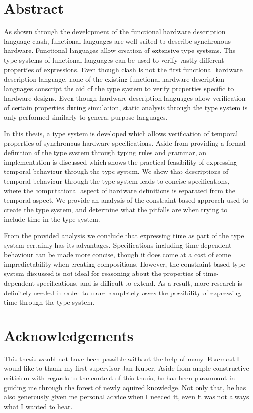 \documentclass[a4paper, 11pt,oldfontcommands]{memoir}
\begin{document}
\chapter{Abstract}
As shown through the development of the functional hardware description language \gls{clash}, functional languages are well suited to describe synchronous hardware.
Functional languages allow creation of extensive type systems.
The type systems of functional languages can be used to verify vastly different properties of expressions.
Even though \gls{clash} is not the first functional hardware description language, none of the existing functional hardware description languages conscript the aid of the type system to verify properties specific to hardware designs.
Even though hardware description languages allow verification of certain properties during simulation, static analysis through the type system is only performed similarly to general purpose languages.

In this thesis, a type system is developed which allows verification of temporal properties of synchronous hardware specifications.
Aside from providing a formal definition of the type system through typing rules and grammar, an implementation is discussed which shows the practical feasibility of expressing temporal behaviour through the type system.
We show that descriptions of temporal behaviour through the type system leads to concise specifications, where the computational aspect of hardware definitions is separated from the temporal aspect.
We provide an analysis of the constraint-based approach used to create the type system, and determine what the pitfalls are when trying to include time in the type system. 

From the provided analysis we conclude that expressing time as part of the type system certainly has its advantages.
Specifications including time-dependent behaviour can be made more concise, though it does come at a cost of some impredictability when creating compositions.
However, the constraint-based type system discussed is not ideal for reasoning about the properties of time-dependent specifications, and is difficult to extend.
As a result, more research is definitely needed in order to more completely asses the possibility of expressing time through the type system.

\cleardoublepage
\chapter{Acknowledgements}
This thesis would not have been possible without the help of many.
Foremost I would like to thank my first supervisor Jan Kuper.
Aside from ample constructive criticism with regards to the content of this thesis, he has been paramount in guiding me through the forest of newly aquired knowledge.
Not only that, he has also generously given me personal advice when I needed it, even it was not always what I wanted to hear.
 
\end{document}
